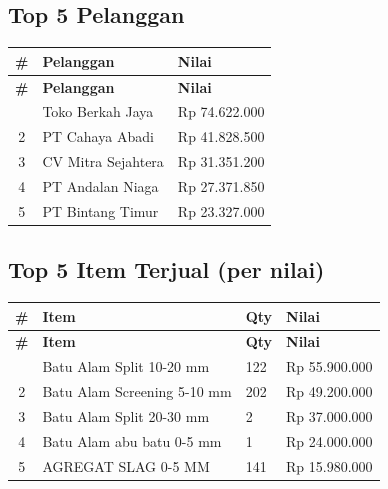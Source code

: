 \documentclass[11pt,a4paper]{article}
\begin{document}
\subsection{Top 5 Pelanggan}
{\setlength{\tabcolsep}{5pt}
\begin{longtable}{c p{7cm} R{3cm}}
\toprule
\textbf{\#} & \textbf{Pelanggan} & \textbf{Nilai} \\
\midrule\endfirsthead
\toprule
\textbf{\#} & \textbf{Pelanggan} & \textbf{Nilai} \\
\midrule\endhead
\bottomrule{} & Toko Berkah Jaya & Rp 74.622.000 \\
2 & PT Cahaya Abadi & Rp 41.828.500 \\
3 & CV Mitra Sejahtera & Rp 31.351.200 \\
4 & PT Andalan Niaga & Rp 27.371.850 \\
5 & PT Bintang Timur & Rp 23.327.000 \\
\end{longtable}}

\subsection{Top 5 Item Terjual (per nilai)}
{\setlength{\tabcolsep}{5pt}
\begin{longtable}{c p{6cm} R{2.4cm} R{3cm}}
\toprule
\textbf{\#} & \textbf{Item} & \textbf{Qty} & \textbf{Nilai} \\
\midrule\endfirsthead
\toprule
\textbf{\#} & \textbf{Item} & \textbf{Qty} & \textbf{Nilai} \\
\midrule\endhead
\bottomrule{} & Batu Alam Split 10-20 mm & 122 & Rp 55.900.000 \\
2 & Batu Alam Screening 5-10 mm & 202 & Rp 49.200.000 \\
3 & Batu Alam Split 20-30 mm & 2 & Rp 37.000.000 \\
4 & Batu Alam abu batu 0-5 mm & 1 & Rp 24.000.000 \\
5 & AGREGAT SLAG 0-5 MM & 141 & Rp 15.980.000 \\
\end{longtable}}
\end{document}
